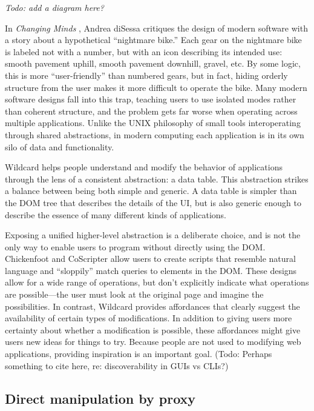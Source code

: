 \documentclass[english,submission]{programming}
\begin{document}
\emph{Todo: add a diagram here?}

In \emph{Changing Minds} \autocite{disessa2000}, Andrea diSessa
critiques the design of modern software with a story about a
hypothetical ``nightmare bike.'' Each gear on the nightmare bike is
labeled not with a number, but with an icon describing its intended use:
smooth pavement uphill, smooth pavement downhill, gravel, etc. By some
logic, this is more ``user-friendly'' than numbered gears, but in fact,
hiding orderly structure from the user makes it more difficult to
operate the bike. Many modern software designs fall into this trap,
teaching users to use isolated modes rather than coherent structure, and
the problem gets far worse when operating across multiple applications.
Unlike the UNIX philosophy of small tools interoperating through shared
abstractions, in modern computing each application is in its own silo of
data and functionality.

Wildcard helps people understand and modify the behavior of applications
through the lens of a consistent abstraction: a data table. This
abstraction strikes a balance between being both simple and generic. A
data table is simpler than the DOM tree that describes the details of
the UI, but is also generic enough to describe the essence of many
different kinds of applications.

Exposing a unified higher-level abstraction is a deliberate choice, and
is not the only way to enable users to program without directly using
the DOM. Chickenfoot \autocite{bolin2005} and CoScripter
\autocite{leshed2008} allow users to create scripts that resemble
natural language and ``sloppily'' match queries to elements in the DOM.
These designs allow for a wide range of operations, but don't explicitly
indicate what operations are possible---the user must look at the
original page and imagine the possibilities. In contrast, Wildcard
provides affordances that clearly suggest the availability of certain
types of modifications. In addition to giving users more certainty about
whether a modification is possible, these affordances might give users
new ideas for things to try. Because people are not used to modifying
web applications, providing inspiration is an important goal. (Todo:
Perhaps something to cite here, re: discoverability in GUIs vs CLIs?)

\hypertarget{direct-manipulation-by-proxy}{%
\subsection{Direct manipulation by
proxy}\label{direct-manipulation-by-proxy}}
\end{document}
